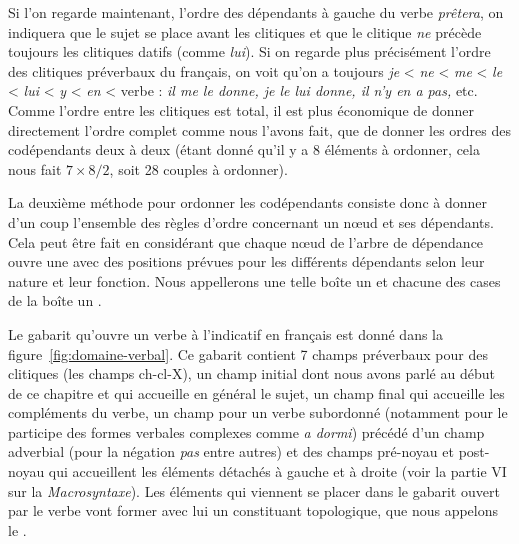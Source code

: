 Si l’on regarde maintenant, l’ordre des dépendants à gauche du verbe \textit{prêtera}, on indiquera que le sujet se place avant les clitiques et que le clitique \textit{ne} précède toujours les clitiques datifs (comme \textit{lui}). Si on regarde plus précisément l’ordre des clitiques préverbaux du français, on voit qu’on a toujours \textit{je} < \textit{ne} < \textit{me} < \textit{le} < \textit{lui} < \textit{y} < \textit{en} < verbe : \textit{il me le donne, je le lui donne, il n’y en a pas,} etc. Comme l’ordre entre les clitiques est total, il est plus économique de donner directement l’ordre complet comme nous l’avons fait, que de donner les ordres des codépendants deux à deux (étant donné qu’il y a 8 éléments à ordonner, cela nous fait $7\times{8}/{2}$, soit 28 couples à ordonner).

La deuxième méthode pour ordonner les codépendants consiste donc à donner d’un coup l’ensemble des règles d’ordre concernant un nœud et ses dépendants. Cela peut être fait en considérant que chaque nœud de l’arbre de dépendance ouvre une  avec des positions prévues pour les différents dépendants selon leur nature et leur fonction. Nous appellerons une telle boîte un  et chacune des cases de la boîte un .%

\begin{sloppypar}
Le gabarit qu’ouvre un verbe à l’indicatif en français est donné dans la figure~\ref{fig:domaine-verbal}. Ce gabarit contient 7 champs préverbaux pour des clitiques (les champs ch-cl-X), un champ initial dont nous avons parlé au début de ce chapitre et qui accueille en général le sujet, un champ final qui accueille les compléments du verbe, un champ pour un verbe subordonné (notamment pour le participe des formes verbales complexes comme \textit{a dormi}) précédé d’un champ adverbial (pour la négation \textit{pas} entre autres) et des champs pré-noyau et post-noyau qui accueillent les éléments détachés à gauche et à droite (voir la partie VI sur la \textit{Macrosyntaxe}). Les éléments qui viennent se placer dans le gabarit ouvert par le verbe vont former avec lui un constituant topologique, que nous appelons le .
\end{sloppypar}

